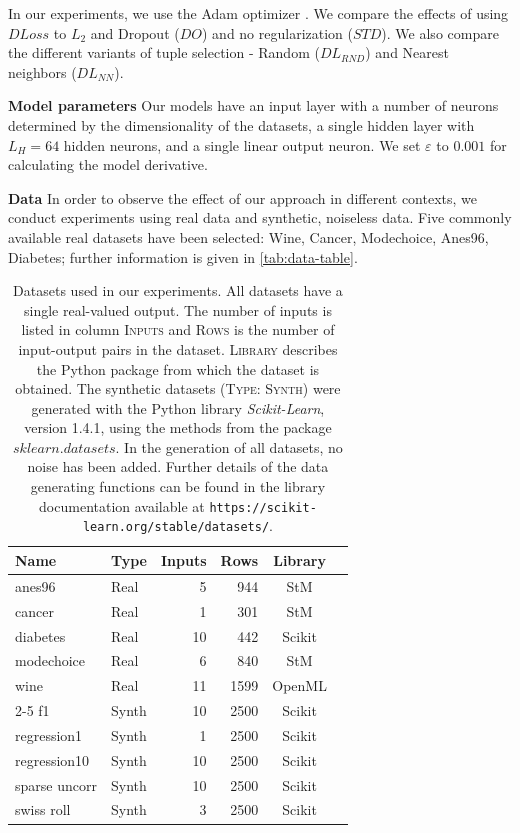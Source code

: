 \documentclass[conference]{IEEEtran}
\begin{document}
In our experiments, we use the Adam optimizer \cite{kingma2015adam}.
We compare the effects of using ${DLoss}$ to $L_2$ and Dropout ($DO$) and no regularization ($STD$). 
We also compare the different variants of tuple selection - Random ($DL_{RND}$) and Nearest neighbors ($DL_{NN}$). 

\textbf{Model parameters} Our models have an input layer with a number of neurons determined by the dimensionality of the datasets, a single hidden layer with $L_H = 64$ hidden neurons, and a single linear output neuron. 
We set $\varepsilon$ to $0.001$ for calculating the model derivative. 


\textbf{Data}
In order to observe the effect of our approach in different contexts, we conduct experiments using real data and synthetic, noiseless data. 
Five commonly available real datasets have been selected: Wine, Cancer, Modechoice, Anes96, Diabetes; further information is given in \autoref{tab:data-table}.


\begin{table}[tb]
 \begin{tabular}{llrrcc}
 \toprule
 Name & Type & Inputs & Rows & Library \\
 
 \midrule
 anes96 & Real & 5 & 944 & StM \\
 cancer & Real & 1 & 301 & StM  \\
 diabetes & Real & 10 & 442 & Scikit \\
 modechoice & Real & 6 & 840 & StM  \\
 wine & Real & 11 & 1599 & OpenML  \\
 \cline{2-5} 
 f1 & Synth & 10 & 2500 & Scikit \\
regression1 & Synth & 1 & 2500 & Scikit \\
 regression10 & Synth & 10 & 2500 & Scikit\\
 sparse uncorr & Synth & 10 & 2500 & Scikit\\
 swiss roll & Synth & 3 & 2500 & Scikit  \\

 \bottomrule
 \end{tabular}
 \caption{Datasets used in our experiments. All datasets have a single real-valued output. 
 The number of inputs is listed in column \textsc{Inputs} and \textsc{Rows} is the number of input-output pairs in the dataset. 
 \textsc{Library} describes the Python package from which the dataset is obtained.
 The synthetic datasets (\textsc{Type: Synth}) were generated with the Python library \emph{Scikit-Learn}, version 1.4.1, using the methods from the package $sklearn.datasets$. 
 In the generation of all datasets, no noise has been added.
 Further details of the data generating functions can be found in the library documentation available at \texttt{\textup{https://scikit-learn.org/stable/datasets/}}.
 }
 \label{tab:data-table} 
\end{table}
\end{document}
